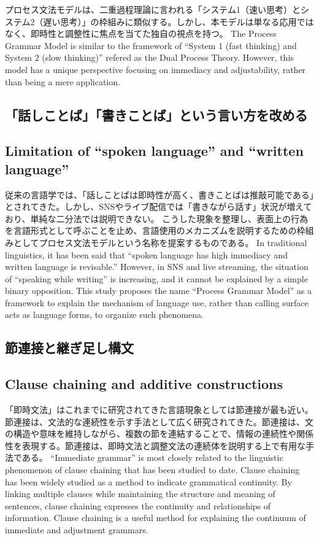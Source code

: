\documentclass[a4paper,xelatex,ja=standard]{bxjsarticle}
\begin{document}
\ifJPN
プロセス文法モデルは、二重過程理論に言われる「システム1（速い思考）とシステム2（遅い思考）」の枠組みに類似する。しかし、本モデルは単なる応用ではなく、即時性と調整性に焦点を当てた独自の視点を持つ\autocite{Evans2008, Kahneman2011-KAHTFA-2,squire2009memory}。
\else
The Process Grammar Model is similar to the framework of ``System 1 (fast thinking) and System 2 (slow thinking)'' refered as the Dual Process Theory. However, this model has a unique perspective focusing on immediacy and adjustability, rather than being a mere application.\autocite{Evans2008, Kahneman2011-KAHTFA-2,squire2009memory}
\fi

\ifJPN
  \subsection{「話しことば」「書きことば」という言い方を改める}
\else
  \subsection{Limitation of ``spoken language'' and ``written language''}
\fi

\ifJPN
従来の言語学では、「話しことばは即時性が高く、書きことばは推敲可能である」とされてきた。しかし、SNSやライブ配信では「書きながら話す」状況が増えており、単純な二分法では説明できない。
こうした現象を整理し、表面上の行為を言語形式として呼ぶことを止め、言語使用のメカニズムを説明するための枠組みとしてプロセス文法モデルという名称を提案するものである。
\else
In traditional linguistics, it has been said that ``spoken language has high immediacy and written language is revisable.'' However, in SNS and live streaming, the situation of ``speaking while writing'' is increasing, and it cannot be explained by a simple binary opposition.
This study proposes the name ``Process Grammar Model'' as a framework to explain the mechanism of language use, rather than calling surface acts as language forms, to organize such phenomena.
\fi


\ifJPN
  \subsection{節連接と継ぎ足し構文}
\else
  \subsection{Clause chaining and additive constructions}
\fi

\ifJPN
「即時文法」はこれまでに研究されてきた言語現象としては節連接が最も近い。
節連接は、文法的な連続性を示す手法として広く研究されてきた。節連接は、文の構造や意味を維持しながら、複数の節を連結することで、情報の連続性や関係性を表現する。節連接は、即時文法と調整文法の連続体を説明する上で有用な手法である。
\else
``Immediate grammar'' is most closely related to the linguistic phenomenon of clause chaining that has been studied to date. Clause chaining has been widely studied as a method to indicate grammatical continuity. By linking multiple clauses while maintaining the structure and meaning of sentences, clause chaining expresses the continuity and relationships of information. Clause chaining is a useful method for explaining the continuum of immediate and adjustment grammars.
\fi
\end{document}
